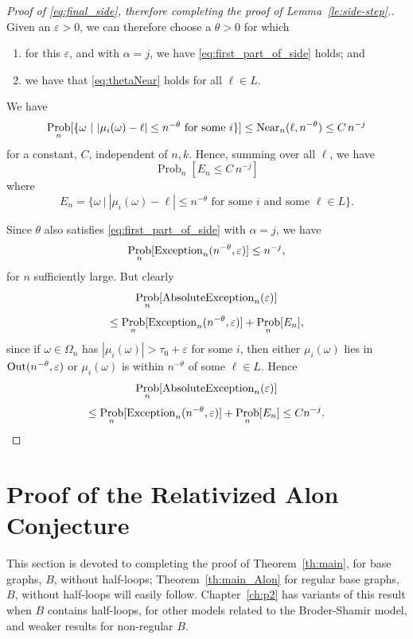 \documentclass{memo-l}
\newenvironment{jfnote}{ \bgroup \color{blue} }{\egroup}
\newcommand{\mynote}[1]{\begin{jfnote}#1\end{jfnote}}
\theoremstyle{plain}
\theoremstyle{definition}
\numberwithin{section}{chapter}
\numberwithin{equation}{chapter}
\DeclareMathOperator{\Prob}{Prob}
\theoremstyle{plain}
\theoremstyle{definition}
\begin{document}
\begin{proof}[Proof of \eqref{eq:final_side}, therefore
completing the proof of Lemma~\ref{le:side-step}.]
Given an $\varepsilon>0$, we can therefore choose a
$\theta>0$ for which \begin{enumerate} \item for this $\varepsilon$, and
with $\alpha=j$, we have \eqref{eq:first_part_of_side} holds; and \item we
have that \eqref{eq:thetaNear} holds for all $\ell\in L$.  \end{enumerate}

We have \[ \Prob_n[ \{ \omega\ | \ \mbox{$|\mu_i(\omega)-\ell|\leq
n^{-\theta}$ for some $i$} \} ] \leq {\rm Near}_n(\ell,n^{-\theta}) \leq C
\, n^{-j} \] for a constant, $C$, independent of $n,k$.  Hence, summing
over all $\ell$, we have \[ \Prob_n[ E_n \leq C\,n^{-j}] \] where \[ E_n =
\{ \omega\ |\ \mbox{$|\mu_i(\omega)-\ell|\leq n^{-\theta}$ for some $i$ and
some $\ell\in L$} \} .  \]

Since $\theta$ also satisfies \eqref{eq:first_part_of_side} with
$\alpha=j$, we have \[ \Prob_n[{\rm Exception}_n(n^{-\theta},\varepsilon) ]
\leq n^{-j}, \] for $n$ sufficiently large.  But clearly \[ \Prob_n[{\rm
AbsoluteException}_n(\varepsilon)] \] \[ \le \Prob_n[{\rm
Exception}_n(n^{-\theta},\varepsilon) ] + \Prob_n[ E_n ], \] since if
$\omega\in\Omega_n$ has $|\mu_i(\omega)|>\tau_0+\varepsilon$ for some $i$,
then either $\mu_i(\omega)$ lies in ${\rm Out}(n^{-\theta},\varepsilon)$ or
$\mu_i(\omega)$ is within $n^{-\theta}$ of some $\ell\in L$.  Hence \[
\Prob_n[{\rm AbsoluteException}_n(\varepsilon)] \] \[ \le \Prob_n[{\rm
Exception}_n(n^{-\theta},\varepsilon) ] + \Prob_n[ E_n ] \leq C n^{-j}.  \]
\end{proof}
\section{Proof of the Relativized Alon Conjecture}
\label{section:main_proof}
\label{se:p1-main-proof}

% 

This section is devoted to completing the proof of
Theorem~\ref{th:main}, for base graphs, $B$, without half-loops;
Theorem~\ref{th:main_Alon} for 
regular base graphs, $B$, without half-loops will easily follow.
Chapter~\ref{ch:p2}
has variants of this result when $B$ contains half-loops, for
other models related to the Broder-Shamir model, and
weaker results for non-regular
$B$.
\end{document}
